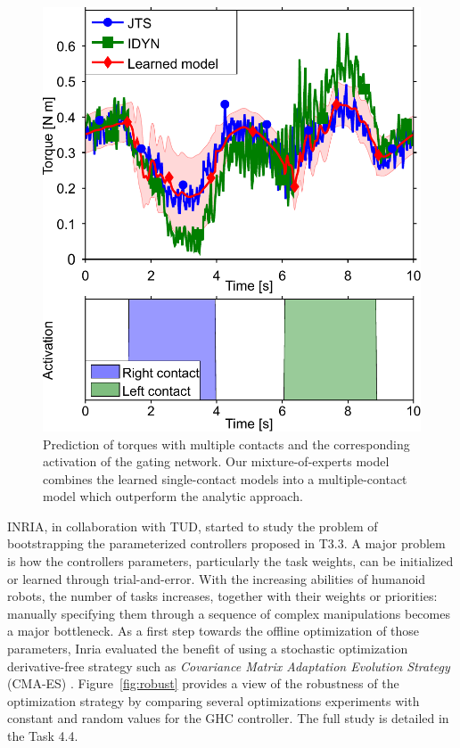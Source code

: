 \begin{figure}[t]
\begin{minipage}{.52\linewidth}
			\includegraphics[width=.89\linewidth]{images/exp3_both}
			\caption{Prediction of torques with multiple contacts and the corresponding activation of the gating network.
			Our mixture-of-experts model combines the learned single-contact models into a multiple-contact model which outperform the analytic approach.
			}
			\label{fig:exp3:gating}
		\end{minipage}	
	\end{figure}
	
INRIA, in collaboration with TUD, started to study the problem of bootstrapping the parameterized controllers proposed in T3.3. A major problem is how the controllers parameters, particularly the task weights, can be initialized or learned through trial-and-error. With the increasing abilities of humanoid robots, the number of tasks increases, together with their weights or priorities: manually specifying them through a sequence of complex manipulations becomes a major bottleneck. 
As a first step towards the offline optimization of those parameters, Inria evaluated the benefit of using a stochastic optimization derivative-free strategy such as \textit{Covariance Matrix Adaptation Evolution Strategy} (CMA-ES) \cite{Hansen-2001-ID362}. Figure~\ref{fig:robust} provides a view of the robustness of the optimization strategy by comparing several optimizations experiments with constant and random values for the GHC controller.
The full study is detailed in the Task 4.4.\\

